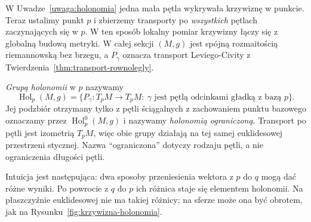 W Uwadze~\ref{uwaga:holonomia} jedna mała pętla wykrywała
krzywiznę w punkcie. Teraz ustalimy punkt $p$ i zbierzemy
transporty po \emph{wszystkich} pętlach zaczynających się w $p$.
W ten sposób lokalny pomiar krzywizny łączy się z globalną
budową metryki. W całej sekcji $(M,g)$ jest spójną rozmaitością
riemannowską bez brzegu, a $P_\gamma$ oznacza transport
Leviego-Civity z Twierdzenia~\ref{thm:transport-rownolegly}.

\begin{definicja}
\label{def:grupa-holonomii}
\emph{Grupą holonomii} w $p$ nazywamy
\[
 \operatorname{Hol}_p(M,g)
 =\{P_\gamma:T_pM\longrightarrow T_pM:\
   \gamma\text{ jest pętlą odcinkami gładką z bazą }p\}.
\]
Jej podzbiór otrzymany tylko z pętli ściągalnych
z zachowaniem punktu bazowego oznaczamy przez
$\operatorname{Hol}^0_p(M,g)$ i nazywamy
\emph{holonomią ograniczoną}. Transport po pętli jest
izometrią $T_pM$, więc obie grupy działają na tej samej
euklidesowej przestrzeni stycznej. Nazwa ``ograniczona''
dotyczy rodzaju pętli, a nie ograniczenia długości pętli.
\end{definicja}

Intuicja jest następująca: dwa sposoby przeniesienia wektora
z $p$ do $q$ mogą dać różne wyniki. Po powrocie z $q$ do $p$
ich różnica staje się elementem holonomii. Na płaszczyźnie
euklidesowej nie ma takiej różnicy; na sferze może ona być
obrotem, jak na Rysunku~\ref{fig:krzywizna-holonomia}.

